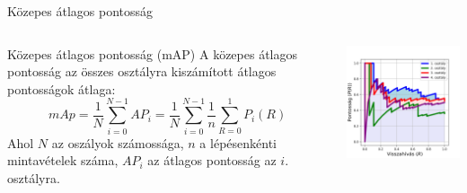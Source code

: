 \documentclass[english, aspectratio=169]{beamer}
\begin{document}
	\begin{frame}{Közepes átlagos pontosság}
		\begin{columns}
			\begin{column}{.5\textwidth}
				\begin{block}{Közepes átlagos pontosság (mAP)}
					A közepes átlagos pontosság az összes osztályra kiszámított átlagos pontosságok átlaga:
					\[
					mAp = \frac{1}{N} \sum_{i=0}^{N-1} AP_i = \frac{1}{N} \sum_{i=0}^{N-1} \frac{1}{n} \sum_{R=0}^1 P_i(R)
					\]
					Ahol $N$ az oszályok számossága, $n$ a lépésenkénti mintavételek száma, $AP_i$ az átlagos pontosság  az $i$. osztályra.
				\end{block}
			\end{column}
			\begin{column}{.5\textwidth}
				\begin{center}
					\includegraphics[width=7cm, keepaspectratio]{images/od_13.png}
				\end{center}
			\end{column}
		\end{columns}
	\end{frame}
	
\end{document}
